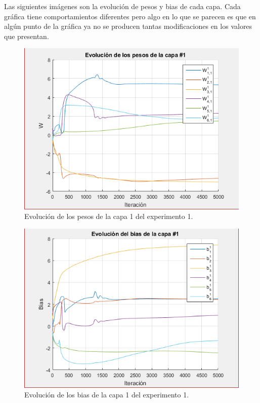 \documentclass[12pt, titlepage]{article}
\begin{document}
Las siguientes imágenes son la evolución de pesos y bias de cada capa. Cada gráfica tiene comportamientos diferentes pero algo en lo que se parecen es que en algún punto de la gráfica ya no se producen tantas modificaciones en los valores que presentan.
\begin{figure}[H]
    \begin{center}
        \includegraphics[width=12cm]{1/pesos1.png}
        \caption{Evolución de los pesos de la capa 1 del experimento 1.}
        \label{fig:pesos1}
    \end{center}
\end{figure}

\begin{figure}[H]
    \begin{center}
        \includegraphics[width=12cm]{1/bias1.png}
        \caption{Evolución de los bias de la capa 1 del experimento 1.}
        \label{fig:bias1}
    \end{center}
\end{figure}
\end{document}
